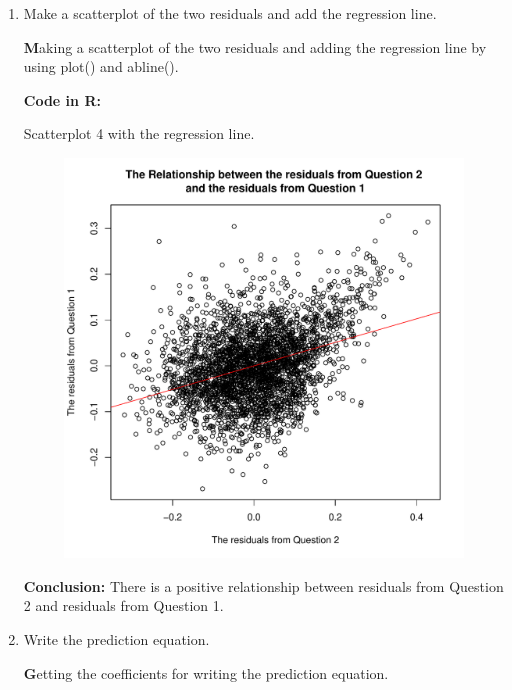 \documentclass[12pt,letterpaper]{article}
\begin{document}
\begin{enumerate}
		\item Make a scatterplot of the two residuals and add the regression line. 	\vspace{0.5cm}
		
		\noindent \textbf Making a scatterplot of the two residuals and adding the regression line by using plot() and abline(). \vspace{0.5cm}
		
		\noindent \textbf{Code in R:}
		  
		\vspace{.25cm}
		
\begin{center}
			\noindent Scatterplot 4 with the regression line.
\end{center}
		
		
		\begin{figure}[h!]\centering


			\includegraphics[width=.75\textwidth]{scatterplot_q4.pdf}
		\end{figure}
		
		\vspace{0.5cm}
		
		\noindent \textbf{Conclusion:} There is a positive relationship between residuals from Question 2 and residuals from Question 1.
		\vspace{0.5cm}
		
		\item Write the prediction equation.
		
		\noindent \textbf Getting the coefficients for writing the prediction equation. 
		\vspace{0.5cm}
		

\end{enumerate}
\end{document}
